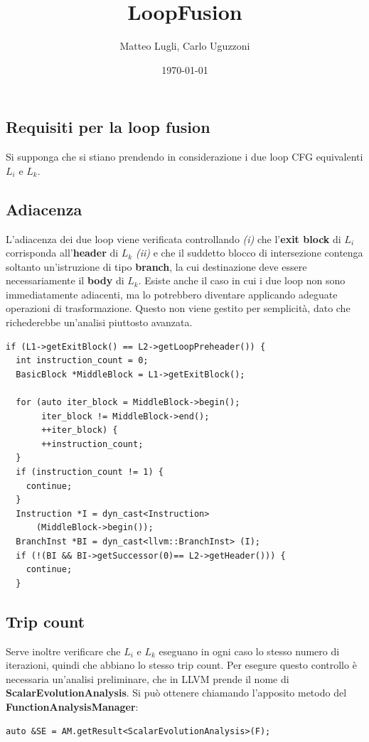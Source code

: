 \documentclass[letterpaper, 11pt]{article}
\author{Matteo Lugli, Carlo Uguzzoni}
\date{\today}
\title{LoopFusion}
\begin{document}
\maketitle
\tableofcontents

\newpage
\begin{multicols}{2}
\section{Requisiti per la loop fusion}
\label{sec:org91db0c9}
Si supponga che si stiano prendendo in considerazione i due loop CFG equivalenti
\(L_{i}\) e \(L_{k}\).
\subsection{Adiacenza}
\label{sec:org672f0d8}
L'adiacenza dei due loop viene verificata controllando \emph{(i)} che l'\textbf{exit block} di
\(L_{i}\) corrisponda all'\textbf{header} di \(L_{k}\) \emph{(ii)} e che il suddetto blocco di intersezione
contenga soltanto un'istruzione di tipo \textbf{branch}, la cui destinazione deve essere necessariamente
il \textbf{body} di \(L_{k}\).
Esiste anche il caso in cui i due loop non sono immediatamente adiacenti, ma lo
potrebbero diventare applicando adeguate operazioni di trasformazione. Questo
non viene gestito per semplicità, dato che richederebbe un'analisi piuttosto avanzata.
\footnotesize
\begin{verbatim}
if (L1->getExitBlock() == L2->getLoopPreheader()) {
  int instruction_count = 0;
  BasicBlock *MiddleBlock = L1->getExitBlock();

  for (auto iter_block = MiddleBlock->begin(); 
	   iter_block != MiddleBlock->end(); 
	   ++iter_block) {
	   ++instruction_count;
  }
  if (instruction_count != 1) {
	continue;
  }
  Instruction *I = dyn_cast<Instruction> 
	  (MiddleBlock->begin());
  BranchInst *BI = dyn_cast<llvm::BranchInst> (I);
  if (!(BI && BI->getSuccessor(0)== L2->getHeader())) {
	continue;
  }
\end{verbatim}
\normalsize
\subsection{Trip count}
\label{sec:org6eaa71b}
Serve inoltre verificare che \(L_{i}\) e \(L_{k}\) eseguano in ogni caso
lo stesso numero di iterazioni, quindi che abbiano lo stesso trip count.
Per esegure questo controllo è necessaria un'analisi preliminare, che
in LLVM prende il nome di \textbf{ScalarEvolutionAnalysis}. Si può ottenere
chiamando l'apposito metodo del \textbf{FunctionAnalysisManager}: 
\footnotesize
\begin{verbatim}
auto &SE = AM.getResult<ScalarEvolutionAnalysis>(F);
\end{verbatim}
\normalsize

\end{multicols}
\end{document}

